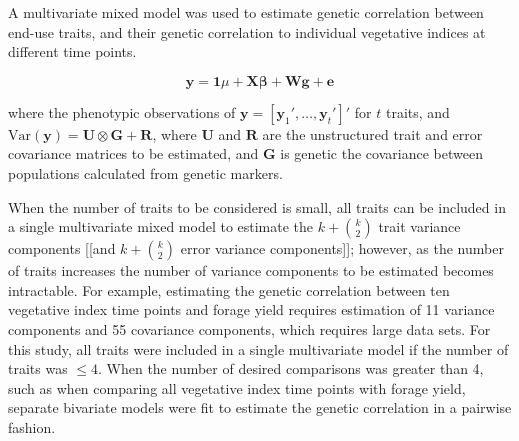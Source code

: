 \documentclass[12pt, letterpaper]{article}
\begin{document}
A multivariate mixed model was used to estimate genetic correlation between end-use traits, and their genetic correlation to individual vegetative indices at different time points. 

\begin{equation} \label{rr}
	 \mathbf{y} = \mathbf{1} \mu + \mathbf{X} \boldsymbol{\beta} + \mathbf{W}\mathbf{g} + \mathbf{e} 
\end{equation}

where the phenotypic observations of $\mathbf{y} = [\mathbf{y}_1', \ldots, \mathbf{y}_t']'$ for $t$ traits, and $\text{Var}(\mathbf{y}) = \mathbf{U} \otimes \mathbf{G} + \mathbf{R}$, where $\mathbf{U}$ and $\mathbf{R}$ are the unstructured trait and error covariance matrices to be estimated, and $\mathbf{G}$ is genetic the covariance between populations calculated from genetic markers.
 


When the number of traits to be considered is small, all traits can be included in a single multivariate mixed model to estimate the $k + \binom{k}{2}$ trait variance components [[and $k + \binom{k}{2}$ error variance components]]; however, as the number of traits increases the number of variance components to be estimated becomes intractable. For example, estimating the genetic correlation between ten vegetative index time points and forage yield requires estimation of 11 variance components and 55 covariance components, which requires large data sets. For this study, all traits were included in a single multivariate model if the number of traits was $\leq 4$. When the number of desired comparisons was greater than 4, such as when comparing all vegetative index time points with forage yield, separate bivariate models were fit to estimate the genetic correlation in a pairwise fashion. 
\end{document}
